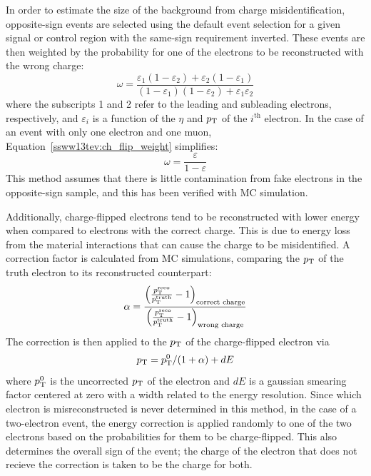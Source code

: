 In order to estimate the size of the background from charge misidentification, opposite-sign events are selected using the default event selection for a given signal or control region with the same-sign requirement inverted.
These events are then weighted by the probability for one of the electrons to be reconstructed with the wrong charge:
\begin{equation}
\omega = \frac{\varepsilon_1(1-\varepsilon_2)+\varepsilon_2(1-\varepsilon_1)}{(1-\varepsilon_1)(1-\varepsilon_2)+\varepsilon_1\varepsilon_2}
\label{ssww13tev:ch_flip_weight}
\end{equation}
where the subscripts 1 and 2 refer to the leading and subleading electrons, respectively, and $\varepsilon_i$ is a function of the $\eta$ and $p_{\mathrm{T}}$ of the $i^{\textrm{th}}$ electron.
In the case of an event with only one electron and one muon, Equation~\ref{ssww13tev:ch_flip_weight} simplifies:
\begin{equation}
\omega = \frac{\varepsilon}{1-\varepsilon}
\end{equation}
This method assumes that there is little contamination from fake electrons in the opposite-sign sample, and this has been verified with MC simulation.

Additionally, charge-flipped electrons tend to be reconstructed with lower energy when compared to electrons with the correct charge.
This is due to energy loss from the material interactions that can cause the charge to be misidentified.
A correction factor is calculated from MC simulations, comparing the $p_{\mathrm{T}}$ of the truth electron to its reconstructed counterpart:
\begin{equation}
\alpha = \frac{\Big(\frac{\pt^{\textrm{reco}}}{\pt^{\textrm{truth}}}-1\Big)_{\textrm{correct charge}}}{\Big(\frac{\pt^{\textrm{reco}}}{\pt^{\textrm{truth}}}-1\Big)_{\textrm{wrong charge}}}
\label{ssww13tev:ch_flip_alpha}
\end{equation}
The correction is then applied to the $p_{\mathrm{T}}$ of the charge-flipped electron via
\begin{equation}
\pt = \pt^0/(1+\alpha)+dE
\label{ssww13tev:ch_flip_energy_corr}
\end{equation}
where $p_{\mathrm{T}}^0$ is the uncorrected $p_{\mathrm{T}}$ of the electron and $dE$ is a gaussian smearing factor centered at zero with a width related to the energy resolution.
Since which electron is misreconstructed is never determined in this method, in the case of a two-electron event, the energy correction is applied randomly to one of the two electrons based on the probabilities for them to be charge-flipped.
This also determines the overall sign of the event; the charge of the electron that does not recieve the correction is taken to be the charge for both.

